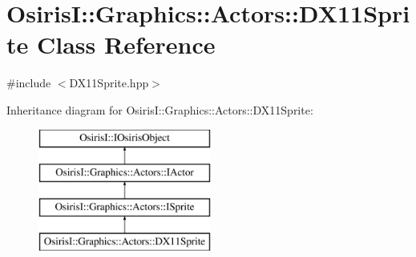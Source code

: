 \hypertarget{class_osiris_i_1_1_graphics_1_1_actors_1_1_d_x11_sprite}{\section{Osiris\-I\-:\-:Graphics\-:\-:Actors\-:\-:D\-X11\-Sprite Class Reference}
\label{class_osiris_i_1_1_graphics_1_1_actors_1_1_d_x11_sprite}
}


{\ttfamily \#include $<$D\-X11\-Sprite.\-hpp$>$}

Inheritance diagram for Osiris\-I\-:\-:Graphics\-:\-:Actors\-:\-:D\-X11\-Sprite\-:\begin{figure}[H]
\begin{center}
\leavevmode
\includegraphics[height=4.000000cm]{class_osiris_i_1_1_graphics_1_1_actors_1_1_d_x11_sprite}
\end{center}
\end{figure}
